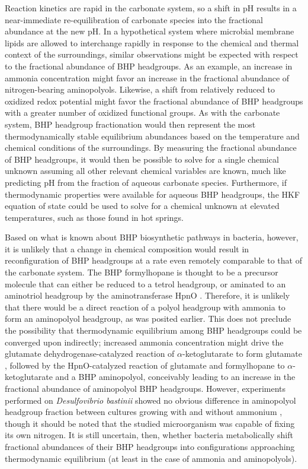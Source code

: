 Reaction kinetics are rapid in the carbonate system, so a shift in pH results in a near-immediate re-equilibration of carbonate species into the fractional abundance at the new pH. In a hypothetical system where microbial membrane lipids are allowed to interchange rapidly in response to the chemical and thermal context of the surroundings, similar observations might be expected with respect to the fractional abundance of BHP headgroups. As an example, an increase in ammonia concentration might favor an increase in the fractional abundance of nitrogen-bearing aminopolyols. Likewise, a shift from relatively reduced to oxidized redox potential might favor the fractional abundance of BHP headgroups with a greater number of oxidized functional groups. As with the carbonate system, BHP headgroup fractionation would then represent the most thermodynamically stable equilibrium abundances based on the temperature and chemical conditions of the surroundings. By measuring the fractional abundance of BHP headgroups, it would then be possible to solve for a single chemical unknown assuming all other relevant chemical variables are known, much like predicting pH from the fraction of aqueous carbonate species. Furthermore, if thermodynamic properties were available for aqueous BHP headgroups, the HKF equation of state could be used to solve for a chemical unknown at elevated temperatures, such as those found in hot springs.

Based on what is known about BHP biosynthetic pathways in bacteria, however, it is unlikely that a change in chemical composition would result in reconfiguration of BHP headgroups at a rate even remotely comparable to that of the carbonate system. The BHP formylhopane is thought to be a precursor molecule that can either be reduced to a tetrol headgroup, or aminated to an aminotriol headgroup by the aminotransferase HpnO \citep{welander2012identification}. Therefore, it is unlikely that there would be a direct reaction of a polyol headgroup with ammonia to form an aminopolyol headgroup, as was posited earlier. This does not preclude the possibility that thermodynamic equilibrium among BHP headgroups could be converged upon indirectly; increased ammonia concentration might drive the glutamate dehydrogenase-catalyzed reaction of $\alpha$-ketoglutarate to form glutamate \citep{lightfoot1988expression}, followed by the HpnO-catalyzed reaction of glutamate and formylhopane to $\alpha$-ketoglutarate and a BHP aminopolyol, conceivably leading to an increase in the fractional abundance of aminopolyol BHP headgroups. However, experiments performed on \textit{Desulfovibrio bastinii} showed no obvious difference in aminopolyol headgroup fraction between cultures growing with and without ammonium \citep{blumenberg2012novel}, though it should be noted that the studied microorganism was capable of fixing its own nitrogen. It is still uncertain, then, whether bacteria metabolically shift fractional abundances of their BHP headgroups into configurations approaching thermodynamic equilibrium (at least in the case of ammonia and aminopolyols).

